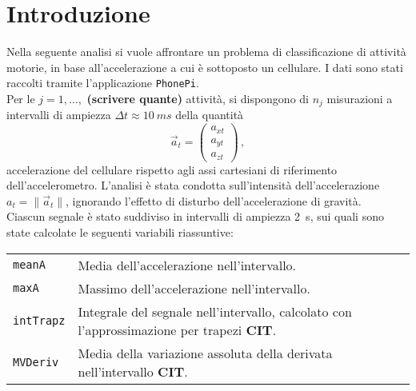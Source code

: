 \documentclass[./main.tex]{subfiles}
\begin{document}
\section{Introduzione}
Nella seguente analisi si vuole affrontare un problema di classificazione di attività motorie, in base all'accelerazione a cui è sottoposto un cellulare. I dati sono stati raccolti tramite l'applicazione \texttt{PhonePi}\cite{kumar2019}.\\
Per le $j = 1, \ldots, $ \textbf{(scrivere quante)} attività, si dispongono di $n_j$ misurazioni a intervalli di ampiezza $\Delta t \approx \SI{10}{ms}$ della quantità
$$
\vec{a}_t = \begin{pmatrix}
a_{xt}\\
a_{yt}\\
a_{zt}
\end{pmatrix}\,,
$$
accelerazione del cellulare rispetto agli assi cartesiani di riferimento dell'accelerometro. L'analisi è stata condotta sull'intensità dell'accelerazione $a_t = \|\vec{a}_t\|$, ignorando l'effetto di disturbo dell'accelerazione di gravità.\\
Ciascun segnale è stato suddiviso in intervalli di ampiezza \SI{2}{s}, sui quali sono state calcolate le seguenti variabili riassuntive:
\begin{table}[H]
	\begin{tabular}{ll}
		\texttt{meanA}& Media dell'accelerazione nell'intervallo.\\
		\texttt{maxA}&Massimo dell'accelerazione nell'intervallo.\\
		\texttt{intTrapz}&Integrale del segnale nell'intervallo, calcolato con l'approssimazione per trapezi \textbf{CIT}.\\
		\texttt{MVDeriv}&Media della variazione assoluta della derivata nell'intervallo \textbf{CIT}.
	\end{tabular}
\end{table}
\end{document}
